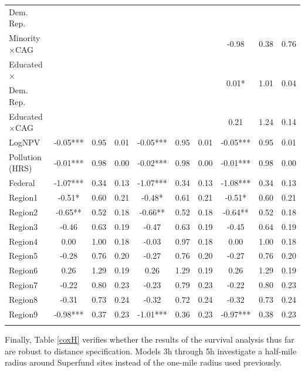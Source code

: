 \documentclass[12pt]{article}
\begin{document}
{\begin{table}[H]
{\begin{tabular}{lccc|ccc|ccc}
			 \hspace{10pt}Dem. Rep. & & & & & & & & & \\
			Minority$\times$CAG &       &       &       &       &       &       &  {-0.98} &  {0.38}  & {0.76} \\
			Educated$\times$ &       &       &       &       &       &       & \multirow{2}{*}{0.01*} & \multirow{2}{*}{1.01}  & \multirow{2}{*}{0.04} \\
			\hspace{10pt}Dem. Rep. & & & & & & & & & \\
			Educated$\times$CAG &       &       &       &       &       &       & 0.21  & 1.24  & 0.14 \\
			LogNPV & -0.05*** & 0.95  & 0.01  & -0.05*** & 0.95  & 0.01  & -0.05*** & 0.95  & 0.01 \\
			Pollution (HRS) & -0.01*** & 0.98  & 0.00  & -0.02*** & 0.98  & 0.00  & -0.01*** & 0.98  & 0.00 \\
			Federal & -1.07*** & 0.34  & 0.13  & -1.07*** & 0.34  & 0.13  & -1.08*** & 0.34  & 0.13 \\
			Region1 & -0.51* & 0.60  & 0.21  & -0.48* & 0.61  & 0.21  & -0.51* & 0.60  & 0.21 \\
			Region2 & -0.65** & 0.52  & 0.18  & -0.66** & 0.52  & 0.18  & -0.64** & 0.52  & 0.18 \\
			Region3 & -0.46 & 0.63  & 0.19  & -0.47 & 0.63  & 0.19  & -0.45 & 0.64  & 0.19 \\
			Region4 & 0.00  & 1.00  & 0.18  & -0.03 & 0.97  & 0.18  & 0.00  & 1.00  & 0.18 \\
			Region5 & -0.28 & 0.76  & 0.20  & -0.27 & 0.76  & 0.20  & -0.27 & 0.76  & 0.20 \\
			Region6 & 0.26  & 1.29  & 0.19  & 0.26  & 1.29  & 0.19  & 0.26  & 1.29  & 0.19 \\
			Region7 & -0.22 & 0.80  & 0.23  & -0.23 & 0.79  & 0.23  & -0.22 & 0.80  & 0.23 \\
			Region8 & -0.31 & 0.73  & 0.24  & -0.32 & 0.72  & 0.24  & -0.32 & 0.73  & 0.24 \\
			Region9 & -0.98*** & 0.37  & 0.23  & -1.01*** & 0.36  & 0.23  & -0.97*** & 0.38  & 0.23 \\
			\hline
			\addlinespace[1ex]
			\multicolumn{3}{l}{\textsuperscript{***}$p\leq0.001$, 
				\textsuperscript{**}$p\leq0.01$, 
				\textsuperscript{*}$p\leq0.05$}
	\end{tabular}}
\end{table}


Finally, Table \ref{coxH} verifies whether the results of the survival analysis thus far are robust to distance specification. Models 3h through 5h investigate a half-mile radius around Superfund sites instead of the one-mile radius used previously. 


}
\end{document}
